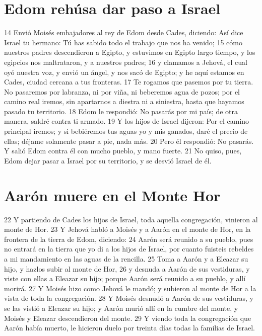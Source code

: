 \section*{Edom rehúsa dar paso a Israel}

14 Envió Moisés embajadores al rey de Edom desde Cades, diciendo: Así dice Israel tu hermano: Tú has sabido todo el trabajo que nos ha venido;
15 cómo nuestros padres descendieron a Egipto, y estuvimos en Egipto largo tiempo, y los egipcios nos maltrataron, y a nuestros padres;
16 y clamamos a Jehová, el cual oyó nuestra voz, y envió un ángel, y nos sacó de Egipto; y he aquí estamos en Cades, ciudad cercana a tus fronteras.
17 Te rogamos que pasemos por tu tierra. No pasaremos por labranza, ni por viña, ni beberemos agua de pozos; por el camino real iremos, sin apartarnos a diestra ni a siniestra, hasta que hayamos pasado tu territorio.
18 Edom le respondió: No pasarás por mi país; de otra manera, saldré contra ti armado.
19 Y los hijos de Israel dijeron: Por el camino principal iremos; y si bebiéremos tus aguas yo y mis ganados, daré el precio de ellas; déjame solamente pasar a pie, nada más.
20 Pero él respondió: No pasarás. Y salió Edom contra él con mucho pueblo, y mano fuerte.
21 No quiso, pues, Edom dejar pasar a Israel por su territorio, y se desvió Israel de él.

\section*{Aarón muere en el Monte Hor}

22 Y partiendo de Cades los hijos de Israel, toda aquella congregación, vinieron al monte de Hor.
23 Y Jehová habló a Moisés y a Aarón en el monte de Hor, en la frontera de la tierra de Edom, diciendo:
24 Aarón será reunido a su pueblo, pues no entrará en la tierra que yo di a los hijos de Israel, por cuanto fuisteis rebeldes a mi mandamiento en las aguas de la rencilla.
25 Toma a Aarón y a Eleazar su hijo, y hazlos subir al monte de Hor,
26 y desnuda a Aarón de sus vestiduras, y viste con ellas a Eleazar su hijo; porque Aarón será reunido a su pueblo, y allí morirá.
27 Y Moisés hizo como Jehová le mandó; y subieron al monte de Hor a la vista de toda la congregación.
28 Y Moisés desnudó a Aarón de sus vestiduras, y se las vistió a Eleazar su hijo; y Aarón murió allí en la cumbre del monte, y Moisés y Eleazar descendieron del monte.
29 Y viendo toda la congregación que Aarón había muerto, le hicieron duelo por treinta días todas la familias de Israel.

